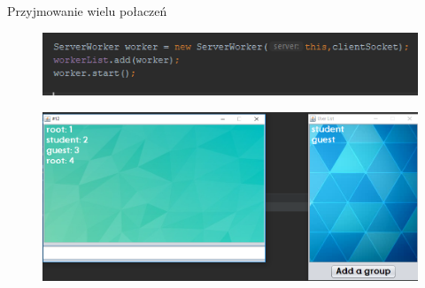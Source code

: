 \documentclass{beamer}
\begin{document}
\begin{frame}{Przyjmowanie wielu połaczeń}
\begin{figure}
 \includegraphics[scale=0.8]{serverWorker}
\end{figure}
\begin{figure}
 \centering
\includegraphics[scale=0.4]{grp}
\end{figure}
\end{frame}
\end{document}
